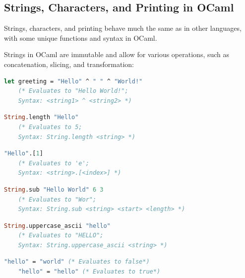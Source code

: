 \newpage

\subsection{Strings, Characters, and Printing in OCaml}

Strings, characters, and printing behave much the same as in other languages, with some unique functions and syntax in OCaml.

\begin{Def}

Strings in OCaml are immutable and allow for various operations, such as concatenation, slicing, and transformation:

    \begin{lstlisting}[language=OCaml, caption={Creating and Concatenating Strings}, numbers=none]
    let greeting = "Hello" ^ " " ^ "World!"
    (* Evaluates to "Hello World!"; 
    Syntax: <string1> ^ <string2> *)
    \end{lstlisting}

    \begin{lstlisting}[language=OCaml, caption={Getting the Length of a String}, numbers=none]
    String.length "Hello"
    (* Evaluates to 5; 
    Syntax: String.length <string> *)
    \end{lstlisting}

    \begin{lstlisting}[language=OCaml, caption={Accessing a Character in a String}, numbers=none]
    "Hello".[1]
    (* Evaluates to 'e'; 
    Syntax: <string>.[<index>] *)
    \end{lstlisting}

    \begin{lstlisting}[language=OCaml, caption={Slicing a String}, numbers=none]
    String.sub "Hello World" 6 3
    (* Evaluates to "Wor"; 
    Syntax: String.sub <string> <start> <length> *)
    \end{lstlisting}


    \begin{lstlisting}[language=OCaml, caption={Converting to Uppercase}, numbers=none]
    String.uppercase_ascii "hello"
    (* Evaluates to "HELLO"; 
    Syntax: String.uppercase_ascii <string> *)
    \end{lstlisting}

    \begin{lstlisting}[language=OCaml, caption={String Equality}, numbers=none]
    "hello" = "world" (* Evaluates to false*)
    "hello" = "hello" (* Evaluates to true*)
    \end{lstlisting}
\end{Def}

